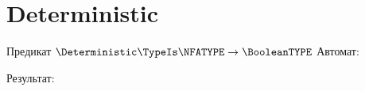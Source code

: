 \section{Deterministic}
\begin{frame}{Предикат $\Deterministic\TypeIs\NFATYPE\to\BooleanTYPE$}
	Автомат:


	Результат:

\end{frame}
